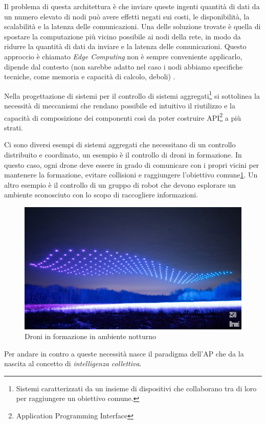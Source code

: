 \documentclass[12pt,a4paper,openright,twoside]{book}
\begin{document}
Il problema di questa architettura è che inviare queste ingenti quantità di dati da un numero elevato di nodi può avere effetti negati sui costi, le disponibilità, la scalabilità e la latenza delle comunicazioni. Una delle soluzione trovate è quella di spostare la computazione più vicino possibile ai nodi della rete, in modo da ridurre la quantità di dati da inviare e la latenza delle comunicazioni. Questo approccio è chiamato \textit{Edge Computing} non è sempre conveniente applicarlo, dipende dal contesto (non sarebbe adatto nel caso i nodi abbiamo specifiche tecniche, come memoria e capacità di calcolo, deboli) \cite{Testa2022}. 

Nella progettazione di sistemi per il controllo di sistemi aggregati\footnote{Sistemi caratterizzati da un insieme di dispositivi che collaborano tra di loro per raggiungere un obiettivo comune.} si sottolinea la necessità di meccanismi che rendano possibile ed intuitivo il riutilizzo e la capacità di composizione dei componenti così da poter costruire API\footnote{Application Programming Interface} a più strati.

Ci sono diversi esempi di sistemi aggregati che necessitano di un controllo distribuito e coordinato, un esempio è il controllo di droni in formazione. In questo caso, ogni drone deve essere in grado di comunicare con i propri vicini per mantenere la formazione, evitare collisioni e raggiungere l'obiettivo comune\cref{fig:drones}. Un altro esempio è il controllo di un gruppo di robot che devono esplorare un ambiente sconosciuto con lo scopo di raccogliere informazioni.

\begin{figure}
    \centering
    \includegraphics[width=.7\linewidth]{figures/drones.jpg}
    \caption{Droni in formazione in ambiente notturno}
    \label{fig:drones}
\end{figure}

Per andare in contro a queste necessità nasce il paradigma dell'\ac{AP} che da la nascita al concetto di \textit{intelligenza collettiva}.
\end{document}
